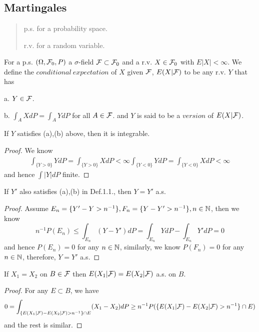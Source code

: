 \chapter{}
\section{Martingales}
\begin{quotation}
p.s. for a probability space.\par
r.v. for a random variable.\par
\end{quotation}
\begin{definition}
For a p.s. $(\Omega, \mathcal{F}_0,P)$ a $\sigma$-field $\mathcal{F} \subset \mathcal{F}_0$ and a r.v. $X\in\mathcal{F}_0$ with $E|X|<\infty$. We define the $conditional\ expectation$ of $X$ given $\mathcal{F}$, $E(X|\mathcal{F})$ to be any r.v. $Y$ that has\par
a. $Y\in\mathcal{F}$.\par
b. $\int_A X dP = \int_A YdP$ for all $A\in\mathcal{F}$.
and $Y$ is said to be a $version$ of $E(X|\mathcal{F})$.
\end{definition}

\begin{lemma}
    If $Y$ satisfies (a),(b) above, then it is integrable.
\end{lemma}
\begin{proof}\par
    We know
    \[
    \begin{aligned}
    \int_{\{Y>0\}} YdP = \int_{\{Y>0\}} XdP < \infty
    \int_{\{Y<0\}} YdP = \int_{\{Y<0\}} XdP <\infty
    \end{aligned}
    \]
    and hence $\int |Y|dP$ finite.\par
\end{proof}
\begin{lemma}
    If $Y'$ also satisfies (a),(b) in Def.1.1., then $Y=Y'$ a.s.
\end{lemma}
\begin{proof}\par
    Assume $E_n = \{Y'-Y > n^{-1}\}, F_n = \{Y-Y' > n^{-1}\}, n\in \mathbb{N}$, then we know
    \[n^{-1}P(E_n) \leq \int_{E_n} (Y-Y')dP = \int_{E_n}Y dP - \int_{E_n} Y' dP = 0\]
    and hence $P(E_n)=0$ for any $n\in\mathbb{N}$, similarly, we know $P(F_n) = 0$ for any $n\in\mathbb{N}$, therefore, $Y=Y'$ a.s.
\end{proof}

\begin{theorem}
    If $X_1 = X_2$ on $B\in \mathcal{F}$ then $E(X_1|\mathcal{F}) = E(X_2|\mathcal{F})$ a.s. on $B$.
\end{theorem}
\begin{proof}\par
    For any $E\subset B$, we have
    \[0 = \int_{\{E(X_1|\mathcal{F})-E(X_2|\mathcal{F})>n^{-1}\}\cap E} (X_1-X_2)dP \geq n^{-1}P(\{E(X_1|\mathcal{F})-E(X_2|\mathcal{F})>n^{-1}\}\cap E)\]
    and the rest is similar.\par
\end{proof}

